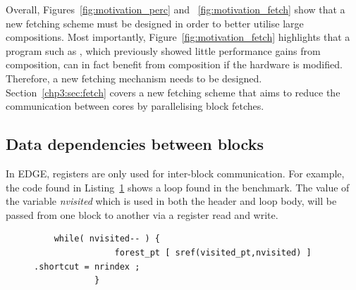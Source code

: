 Overall, Figures~\ref{fig:motivation_perc} and ~\ref{fig:motivation_fetch} show that a new fetching scheme must be designed in order to better utilise large compositions.
Most importantly, Figure~\ref{fig:motivation_fetch} highlights that a program such as , which previously showed little performance gains from composition, can in fact benefit from composition if the hardware is modified.
Therefore, a new fetching mechanism needs to be designed.
Section~\ref{chp3:sec:fetch} covers a new fetching scheme that aims to reduce the communication between cores by parallelising block fetches.

\subsection{Data dependencies between blocks}

In EDGE, registers are only used for inter-block communication.
For example, the code found in Listing~\ref{lst:mser_snipet} shows a loop found in the  benchmark.
The value of the variable \textit{nvisited} which is used in both the header and loop body, will be passed from one block to another via a register read and write.


\begin{figure}[t]
\lstset{language=C,numbersep=4pt}
\begin{center}
\begin{lstlisting}
	while( nvisited-- ) {
				forest_pt [ sref(visited_pt,nvisited) ] .shortcut = nrindex ;
			}
\end{lstlisting}
\end{center}
\vspace{-1em}
\label{lst:mser_snipet}
\vspace{1em}
\end{figure}


